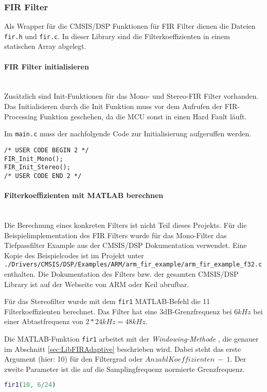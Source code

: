 \subsubsection{FIR Filter}
\label{sec:LibFIRFilter}

Als Wrapper für die CMSIS/DSP Funktionen für FIR Filter dienen die Dateien \texttt{fir.h} und \texttt{fir.c}. In dieser Library sind die Filterkoeffizienten in einem statischen Array abgelegt.
\\
\paragraph{FIR Filter initialisieren}\vspace{-0.3cm}\\
Zusätzlich sind Init-Funktionen für das Mono- und Stereo-FIR Filter vorhanden. 
Das Initialisieren durch die Init Funktion muss vor dem Aufrufen der FIR-Processing Funktion geschehen, da die MCU sonst in einen Hard Fault läuft.

Im \texttt{main.c} muss der nachfolgende Code zur Initialisierung aufgeruffen werden.\\

\begin{lstlisting}[style=Cuvision, caption={Init Funktion der FIR Filter}]
/* USER CODE BEGIN 2 */
FIR_Init_Mono();
FIR_Init_Stereo();
/* USER CODE END 2 */
\end{lstlisting}

\paragraph{Filterkoeffizienten mit MATLAB berechnen}\vspace{-0.3cm}\\
Die Berechnung eines konkreten Filters ist nicht Teil dieses Projekts.
Für die Beispielimplementation des FIR Filters wurde für das Mono-Filter das Tiefpassfilter Example aus der CMSIS/DSP Dokumentation verwendet. 
Eine Kopie des Beispielcodes ist im Projekt unter \\
\texttt{./Drivers/CMSIS/DSP/Examples/ARM/arm\_fir\_example/arm\_fir\_example\_f32.c} enthalten.
Die Dokumentation des Filters bzw. der gesamten CMSIS/DSP Library ist auf der Webseite von ARM \cite{cmsis-doc-arm} oder Keil \cite{cmsis-doc-keil} abrufbar.

Für das Stereofilter wurde mit dem \texttt{fir1} MATLAB-Befehl die 11 Filterkoeffizienten berechnet. Das Filter hat eine 3dB-Grenzfrequenz bei $6\si{kHz}$ bei einer Abtastfrequenz von $2*24\si{kHz}=48\si{kHz}$.

Die MATLAB-Funktion \texttt{fir1} arbeitet mit der \textit{Windowing-Methode} \cite{FIR-Windowing}, die genauer im Abschnitt \ref{sec:LibFIRAdaptive} beschrieben wird.
Dabei steht das erste Argument (hier: 10) für den Filtergrad oder $Anzahl Koeffizienten\ -\ 1$. Der zweite Parameter ist die auf die Samplingfrequenz normierte Grenzfrequenz.\\

\begin{lstlisting}[language=matlab]
fir1(10, 6/24)
\end{lstlisting}